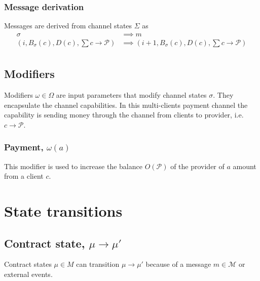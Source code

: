 \documentclass{llncs}
\begin{document}
\subsubsection{Message derivation} Messages are derived from channel states $\Sigma$ as
\begin{equation*}
\begin{split}
    \sigma &\implies m \\
    (i, B_\sigma(c), D(c), \textstyle \sum c \rightarrow \mathcal{P}) &\implies (i+1, B_\sigma(c), D(c), \textstyle \sum c \rightarrow \mathcal{P}) \\
\end{split}
\end{equation*}

\subsection{Modifiers} Modifiers $\omega \in \Omega$ are input parameters that modify channel states $\sigma$. They encapsulate the channel capabilities. In this multi-clients payment channel the capability is sending money through the channel from clients to provider, i.e. $c \rightarrow \mathcal{P}$.

\subsubsection{Payment, $\omega(a)$} This modifier is used to increase the balance $O(\mathcal{P})$ of the provider of $a$ amount from a client $c$.

\section{State transitions}

\subsection{Contract state, $\mu \rightarrow \mu'$} Contract states $\mu \in M$ can transition $\mu \rightarrow \mu'$ because of a message $m \in \mathcal{M}$ or external events.
\end{document}
